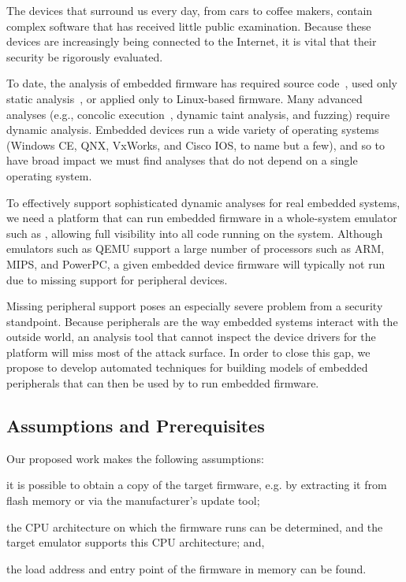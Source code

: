 The devices that surround us every day, from cars to coffee makers,
contain complex software that has received little public examination.
Because these devices are increasingly being connected to the Internet,
it is vital that their security be rigorously evaluated.

To date, the analysis of embedded firmware has required source
code~\cite{davidson:2013:fie}, used only static
analysis~\cite{dreissen:2012:satphone}, or applied only to Linux-based
firmware. Many advanced analyses (e.g., concolic
execution~\cite{godefroid:2005:dart}, dynamic taint analysis, and
fuzzing) require dynamic analysis. Embedded devices run a wide variety
of operating systems (Windows CE, QNX, VxWorks, and Cisco IOS, to name
but a few), and so to have broad impact we must find analyses that do
not depend on a single operating system.

To effectively support sophisticated dynamic analyses for real embedded
systems, we need a platform that can run embedded firmware in a
whole-system emulator such as \dynamicsys, allowing full visibility
into all code running on the system. Although emulators such as QEMU
support a large number of processors such as ARM, MIPS, and PowerPC, a
given embedded device firmware will typically not run due to missing
support for peripheral devices.

Missing peripheral support poses an especially severe problem from a
security standpoint. Because peripherals are the way embedded systems
interact with the outside world, an analysis tool that cannot inspect
the device drivers for the platform will miss most of the attack
surface. In order to close this gap, we propose to develop automated
techniques for building models of embedded peripherals that can then be
used by \dynamicsys to run embedded firmware.

\subsection{Assumptions and Prerequisites}

Our proposed work makes the following assumptions:%
\begin{inparaenum}
    \item it is possible to obtain a copy of the target firmware, e.g.
    by extracting it from flash memory or via the manufacturer's update
    tool;
    \item the CPU architecture on which the firmware runs can be
    determined, and the target emulator supports this CPU architecture;
    and,
    \item the load address and entry point of the firmware in memory can
    be found.
\end{inparaenum}

